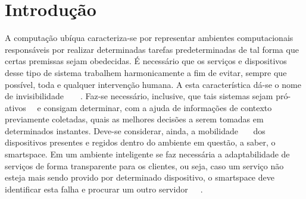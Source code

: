 \chapter{Introdução}

A computação ubíqua caracteriza-se por representar ambientes computacionais responsáveis por realizar determinadas tarefas predeterminadas de tal forma que certas premissas sejam obedecidas. É necessário que os serviços e dispositivos desse tipo de sistema trabalhem harmonicamente a fim de evitar, sempre que possível, toda e qualquer intervenção humana. A esta característica dá-se o nome de invisibilidade~\cite{gomes2007}~\cite{buzeto2010}~\cite{weiser1993}~\cite{weiser1999}. Faz-se necessário, inclusive, que tais sistemas sejam pró-ativos~\cite{gomes2007}~\cite{buzeto2010} e consigam determinar, com a ajuda de informações de contexto previamente coletadas, quais as melhores decisões a serem tomadas em determinados instantes. Deve-se considerar, ainda, a mobilidade~\cite{gomes2007}~\cite{buzeto2010}~\cite{weiser1999} dos dispositivos presentes e regidos dentro do ambiente em questão, a saber, o smartspace. Em um ambiente inteligente se faz necessária a adaptabilidade de serviços de forma transparente para os clientes, ou seja, caso um serviço não esteja mais sendo provido por determinado dispositivo, o smartspace deve identificar esta falha e procurar um outro servidor~\cite{gomes2007}~\cite{passarinho2008}~\cite{paranhos2009}.


